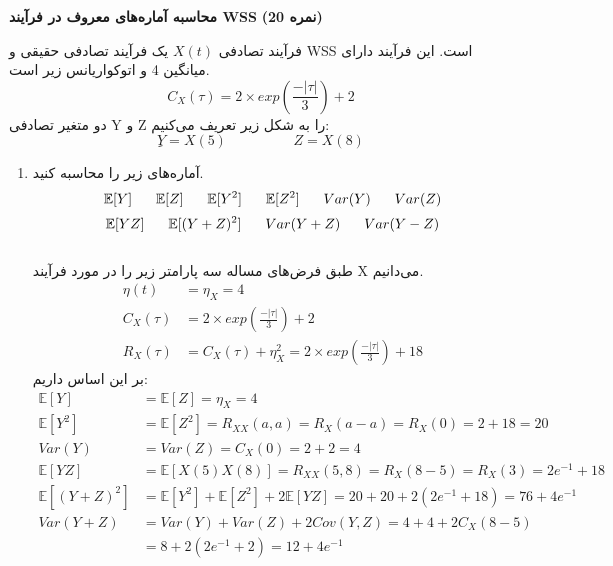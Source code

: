 \Large \textbf{محاسبه آماره‌های معروف در فرآیند WSS}
\large \textbf{(20 نمره)}

\normalsize \vspace{0.5cm}
فرآیند تصادفی
$ X(t) $
یک فرآیند تصادفی حقیقی و WSS است. این فرآیند دارای میانگین 4 و اتوکواریانس زیر است.
$$
C_X(\tau) = 2 \times exp(\frac{-|\tau|}{3}) + 2
$$
دو متغیر تصادفی Y و Z را به شکل زیر تعریف می‌کنیم:
$$
ِY = X(5)  \hspace{2cm} Z = X(8)
$$
\begin{enumerate}[label=(\alph*)]
	\item
	آماره‌های زیر را محاسبه کنید.
	$$
	\mathbb{E}[Y] 
	\hspace{0.6cm} 
	\mathbb{E}[Z] 
	\hspace{0.6cm}
	\mathbb{E}[Y^2] 
	\hspace{0.6cm} 
	\mathbb{E}[Z^2] 
	\hspace{0.6cm}
	Var(Y)
	\hspace{0.6cm} 
	Var(Z)
	$$
	$$
	\mathbb{E}[YZ] 
	\hspace{0.6cm} 
	\mathbb{E}[(Y+Z)^2] 
	\hspace{0.6cm}
	Var(Y + Z)
	\hspace{0.6cm}
	Var(Y - Z)
	$$
	\\
	طبق فرض‌های مساله سه پارامتر زیر را در مورد فرآیند X می‌دانیم.
	\\
	\begin{align*}
		\eta(t) &= \eta_X = 4\\
		C_X(\tau) &=  2 \times exp(\frac{-|\tau|}{3}) + 2\\
		R_X(\tau) &= C_X(\tau) + \eta_X^2 = 2 \times exp(\frac{-|\tau|}{3}) + 18
	\end{align*}
بر این اساس داریم:
	\begin{align*}
		\mathbb{E}[Y] &= \mathbb{E}[Z] = \eta_X = 4 \\
		\mathbb{E}[Y^2] &= \mathbb{E}[Z^2] = R_{XX}(a, a) = R_X(a - a) = R_X(0) = 2 + 18 = 20 \\
		Var(Y) &= Var(Z) = C_X(0) = 2+2 = 4\\
		\mathbb{E}[YZ] &= \mathbb{E}[X(5)X(8)] = R_{XX}(5, 8) = R_X(8-5) = R_X(3) = 2e^{-1} + 18\\
		\mathbb{E}[(Y+Z)^2] &= \mathbb{E}[Y^2] + \mathbb{E}[Z^2] + 2 \mathbb{E}[YZ] = 20 + 20 + 2(2e^{-1} + 18) = 76 + 4e^{-1}\\
		Var(Y + Z) &= Var(Y) + Var(Z) + 2Cov(Y, Z) = 4 + 4 + 2 C_X(8-5) \\
		&=8 + 2(2e^{-1} + 2) = 12 + 4e^{-1} \\

\end{align*}
\end{enumerate}
